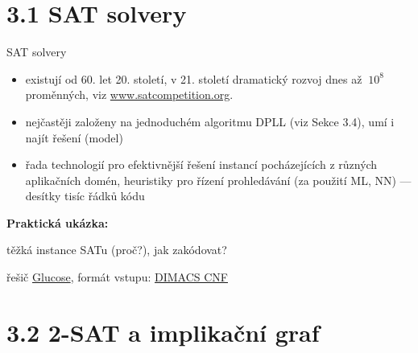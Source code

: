 \documentclass{beamer}
\begin{document}
\section{3.1 SAT solvery}


\begin{frame}{SAT solvery}

    \begin{itemize}
        \item existují od 60. let 20. století, v 21. století dramatický rozvoj dnes až $~10^8$ proměnných, viz \href{http://www.satcompetition.org}{\alert{www.satcompetition.org}}.
        \item nejčastěji založeny na jednoduchém \alert{algoritmu DPLL} (viz Sekce 3.4), umí i najít řešení (model)
        \item řada technologií pro efektivnější řešení instancí pocházejících z různých aplikačních domén, heuristiky pro řízení prohledávání (za použití ML, NN) --- desítky tisíc řádků kódu
    \end{itemize}
    
    \textbf{Praktická ukázka:}


    \vspace{-6pt}
    těžká instance SATu (proč?), jak zakódovat? 
    
    řešič \href{http://www.labri.fr/perso/lsimon/glucose/}{\alert{Glucose}}, formát vstupu: \href{http://people.sc.fsu.edu/~jburkardt/data/cnf/cnf.html}{\alert{DIMACS CNF}}
    
\end{frame}


\section{3.2 2-SAT a implikační graf}
\end{document}
